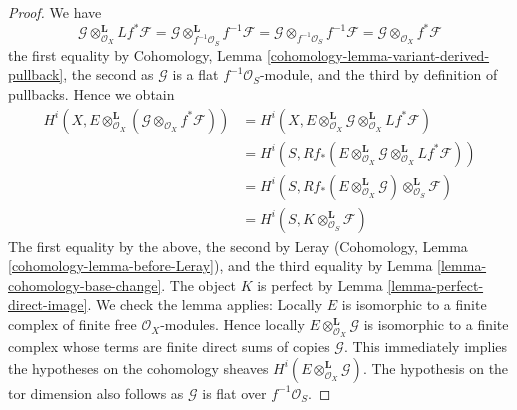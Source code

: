 \begin{proof}
We have
$$
\mathcal{G} \otimes_{\mathcal{O}_X}^\mathbf{L} Lf^*\mathcal{F} =
\mathcal{G} \otimes_{f^{-1}\mathcal{O}_S}^\mathbf{L} f^{-1}\mathcal{F} =
\mathcal{G} \otimes_{f^{-1}\mathcal{O}_S} f^{-1}\mathcal{F} =
\mathcal{G} \otimes_{\mathcal{O}_X} f^*\mathcal{F}
$$
the first equality by
Cohomology, Lemma \ref{cohomology-lemma-variant-derived-pullback},
the second as $\mathcal{G}$ is a flat $f^{-1}\mathcal{O}_S$-module, and
the third by definition of pullbacks. Hence we obtain
\begin{align*}
H^i(X, E \otimes^\mathbf{L}_{\mathcal{O}_X}
(\mathcal{G} \otimes_{\mathcal{O}_X} f^*\mathcal{F}))
& =
H^i(X, E \otimes^\mathbf{L}_{\mathcal{O}_X} \mathcal{G}
\otimes_{\mathcal{O}_X}^\mathbf{L} Lf^*\mathcal{F}) \\
& =
H^i(S,
Rf_*(E \otimes^\mathbf{L}_{\mathcal{O}_X} \mathcal{G}
\otimes^\mathbf{L}_{\mathcal{O}_X} Lf^*\mathcal{F})) \\
& =
H^i(S, Rf_*(E \otimes^\mathbf{L}_{\mathcal{O}_X} \mathcal{G})
\otimes^\mathbf{L}_{\mathcal{O}_S} \mathcal{F}) \\
& =
H^i(S, K \otimes^\mathbf{L}_{\mathcal{O}_S} \mathcal{F}) 
\end{align*}
The first equality by the above, the second by Leray
(Cohomology, Lemma \ref{cohomology-lemma-before-Leray}), and
the third equality by Lemma \ref{lemma-cohomology-base-change}.
The object $K$ is perfect by Lemma \ref{lemma-perfect-direct-image}.
We check the lemma applies: Locally $E$ is isomorphic to a finite complex
of finite free $\mathcal{O}_X$-modules. Hence locally
$E \otimes^\mathbf{L}_{\mathcal{O}_X} \mathcal{G}$ is isomorphic
to a finite complex whose terms are finite direct sums of copies
$\mathcal{G}$. This immediately implies the hypotheses on the
cohomology sheaves $H^i(E \otimes^\mathbf{L}_{\mathcal{O}_X} \mathcal{G})$.
The hypothesis on the tor dimension also follows as $\mathcal{G}$
is flat over $f^{-1}\mathcal{O}_S$.


\end{proof}
